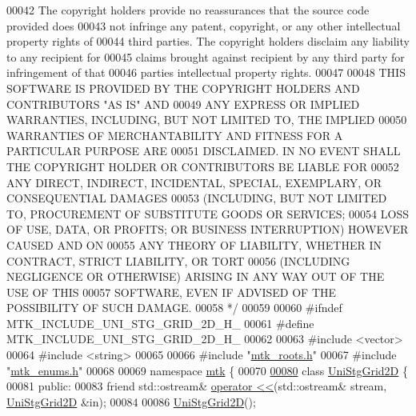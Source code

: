 \begin{DoxyCode}
00042 \textcolor{comment}{The copyright holders provide no reassurances that the source code provided does}
00043 \textcolor{comment}{not infringe any patent, copyright, or any other intellectual property rights of}
00044 \textcolor{comment}{third parties. The copyright holders disclaim any liability to any recipient for}
00045 \textcolor{comment}{claims brought against recipient by any third party for infringement of that}
00046 \textcolor{comment}{parties intellectual property rights.}
00047 \textcolor{comment}{}
00048 \textcolor{comment}{THIS SOFTWARE IS PROVIDED BY THE COPYRIGHT HOLDERS AND CONTRIBUTORS "AS IS" AND}
00049 \textcolor{comment}{ANY EXPRESS OR IMPLIED WARRANTIES, INCLUDING, BUT NOT LIMITED TO, THE IMPLIED}
00050 \textcolor{comment}{WARRANTIES OF MERCHANTABILITY AND FITNESS FOR A PARTICULAR PURPOSE ARE}
00051 \textcolor{comment}{DISCLAIMED. IN NO EVENT SHALL THE COPYRIGHT HOLDER OR CONTRIBUTORS BE LIABLE FOR}
00052 \textcolor{comment}{ANY DIRECT, INDIRECT, INCIDENTAL, SPECIAL, EXEMPLARY, OR CONSEQUENTIAL DAMAGES}
00053 \textcolor{comment}{(INCLUDING, BUT NOT LIMITED TO, PROCUREMENT OF SUBSTITUTE GOODS OR SERVICES;}
00054 \textcolor{comment}{LOSS OF USE, DATA, OR PROFITS; OR BUSINESS INTERRUPTION) HOWEVER CAUSED AND ON}
00055 \textcolor{comment}{ANY THEORY OF LIABILITY, WHETHER IN CONTRACT, STRICT LIABILITY, OR TORT}
00056 \textcolor{comment}{(INCLUDING NEGLIGENCE OR OTHERWISE) ARISING IN ANY WAY OUT OF THE USE OF THIS}
00057 \textcolor{comment}{SOFTWARE, EVEN IF ADVISED OF THE POSSIBILITY OF SUCH DAMAGE.}
00058 \textcolor{comment}{*/}
00059 
00060 \textcolor{preprocessor}{#ifndef MTK\_INCLUDE\_UNI\_STG\_GRID\_2D\_H\_}
00061 \textcolor{preprocessor}{#define MTK\_INCLUDE\_UNI\_STG\_GRID\_2D\_H\_}
00062 
00063 \textcolor{preprocessor}{#include <vector>}
00064 \textcolor{preprocessor}{#include <string>}
00065 
00066 \textcolor{preprocessor}{#include "\hyperlink{mtk__roots_8h}{mtk\_roots.h}"}
00067 \textcolor{preprocessor}{#include "\hyperlink{mtk__enums_8h}{mtk\_enums.h}"}
00068 
00069 \textcolor{keyword}{namespace }\hyperlink{namespacemtk}{mtk} \{
00070 
\hypertarget{mtk__uni__stg__grid__2d_8h_source_l00080}{}\hyperlink{classmtk_1_1UniStgGrid2D}{00080} \textcolor{keyword}{class }\hyperlink{classmtk_1_1UniStgGrid2D}{UniStgGrid2D} \{
00081  \textcolor{keyword}{public}:
00083   \textcolor{keyword}{friend} std::ostream& \hyperlink{classmtk_1_1UniStgGrid2D_a7ede04686da0941288d2078a0c3bab70}{operator <<}(std::ostream& stream, \hyperlink{classmtk_1_1UniStgGrid2D}{UniStgGrid2D} &in);
00084 
00086   \hyperlink{classmtk_1_1UniStgGrid2D_a40db9a6d21e0f4cf70c478fcc3b94531}{UniStgGrid2D}();

\end{DoxyCode}
